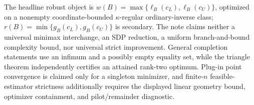 The headline robust object is \(w(B)=\max\{\ell_B(c_L),\ell_B(c_U)\}\), optimized on a nonempty coordinate-bounded \(\kappa\)-regular ordinary-inverse class; \(r(B)=\min\{g_B(c_L),g_B(c_U)\}\) is secondary.  The note claims neither a universal minimax interchange, an SDP reduction, a uniform branch-and-bound complexity bound, nor universal strict improvement.  General completion statements use an infimum and a possibly empty equality set, while the triangle theorem independently certifies an attained rank-two optimum.  Plug-in point convergence is claimed only for a singleton minimizer, and finite-\(n\) feasible-estimator strictness additionally requires the displayed linear geometry bound, optimizer containment, and pilot/remainder diagnostic.
